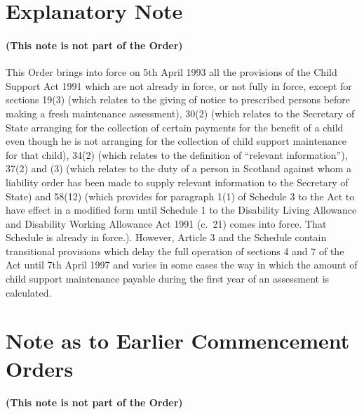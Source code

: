 \documentclass[12pt,a4paper]{article}
\begin{document}

\part{Explanatory Note}

\renewcommand\parthead{--- Explanatory Note}

\subsection*{(This note is not part of the Order)}

 This Order brings into force on 5th April 1993 all the provisions of the Child Support Act 1991 which are not already in force, or not fully in force, except for sections 19(3) (which relates to the giving of notice to prescribed persons before making a fresh maintenance assessment), 30(2) (which relates to the Secretary of State arranging for the collection of certain payments for the benefit of a child even though he is not arranging for the collection of child support maintenance for that child), 34(2) (which relates to the definition of “relevant information”), 37(2) and (3) (which relates to the duty of a person in Scotland against whom a liability order has been made to supply relevant information to the Secretary of State) and 58(12) (which provides for paragraph 1(1) of Schedule 3 to the Act to have effect in a modified form until Schedule 1 to the Disability Living Allowance and Disability Working Allowance Act 1991 (c.\ 21) comes into force. That Schedule is already in force.). However, Article 3 and the Schedule contain transitional provisions which delay the full operation of sections 4 and 7 of the Act until 7th April 1997 and varies in some cases the way in which the amount of child support maintenance payable during the first year of an assessment is calculated.

\part{Note as to Earlier Commencement Orders}

\renewcommand\parthead{--- Note as to Earlier Commencement Orders}

\subsection*{(This note is not part of the Order)}
\end{document}
